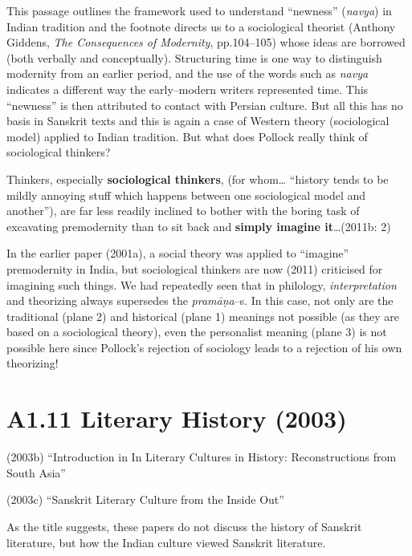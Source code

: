 This passage outlines the framework used to understand “newness” (\textit{navya}) in Indian tradition and the footnote directs us to a sociological theorist (Anthony Giddens, \textit{The Consequences of Modernity}, pp.104–105) whose ideas are borrowed (both verbally and conceptually). Structuring time is one way to distinguish modernity from an earlier period, and the use of the words such as \textit{navya }indicates a different way the early–modern writers represented time. This “newness” is then attributed to contact with Persian culture. But all this has no basis in Sanskrit texts and this is again a case of Western theory (sociological model) applied to Indian tradition. But what does Pollock really think of sociological thinkers?

\newpage

\begin{myquote}
Thinkers, especially \textbf{sociological thinkers}, (for whom… “history tends to be mildly annoying stuff which happens between one sociological model and another”), are far less readily inclined to bother with the boring task of excavating premodernity than to sit back and \textbf{simply imagine it}…(2011b: 2)
\end{myquote}

In the earlier paper (2001a), a social theory was applied to “imagine” premodernity in India, but sociological thinkers are now (2011) criticised for imagining such things. We had repeatedly seen that in philology, \textit{interpretation} and theorizing always supersedes the \textit{pramāṇa}–s. In this case, not only are the traditional (plane 2) and historical (plane 1) meanings not possible (as they are based on a sociological theory), even the personalist meaning (plane 3) is not possible here since Pollock’s rejection of sociology leads to a rejection of his own theorizing!

\vspace {-.4cm}

\section*{A1.11 Literary History (2003)}

(2003b) “Introduction in In Literary Cultures in History: Reconstructions from South Asia”

(2003c) “Sanskrit Literary Culture from the Inside Out”

As the title suggests, these papers do not discuss the history of Sanskrit literature, but how the Indian culture viewed Sanskrit literature.

